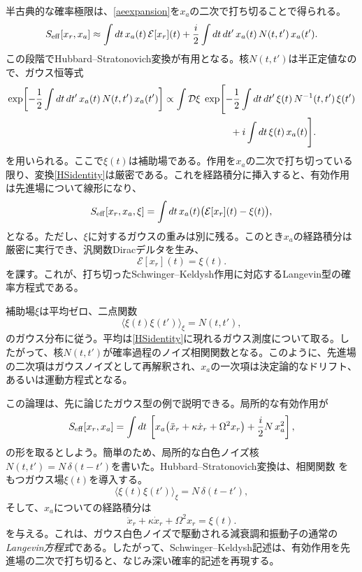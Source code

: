 \documentclass[a4paper,11pt,oneside]{article}
\theoremstyle{definition}
\numberwithin{equation}{section}
\begin{document}
半古典的な確率極限は、\eqref{aeexpansion}を\(x_a\)の二次で打ち切ることで得られる。
\begin{equation}\label{quadratictruncate}
S_{\rm eff}[x_r,x_a]
\approx
\int dt\, x_a(t)\,\mathcal E[x_r](t)
+\frac{i}{2}\int dt\,dt'\,x_a(t)\,N(t,t')\,x_a(t') .
\end{equation}
この段階でHubbard--Stratonovich変換が有用となる。核\(N(t,t')\)は半正定値なので、ガウス恒等式
\begin{align}\label{HSidentity}
\exp\!\left[
-\frac12\int dt\,dt'\,x_a(t)\,N(t,t')\,x_a(t')
\right]
&\propto
\int \mathcal D\xi\;
\exp\Biggl[
-\frac12\int dt\,dt'\,\xi(t)\,N^{-1}(t,t')\,\xi(t')
\nonumber\\
&\hspace{2.4cm}
+i\int dt\,\xi(t)\,x_a(t)
\Biggr] .
\end{align}
を用いられる。ここで\(\xi(t)\)は補助場である。作用を\(x_a\)の二次で打ち切っている限り、変換\eqref{HSidentity}は厳密である。これを経路積分に挿入すると、有効作用は先進場について線形になり、
\begin{equation}
S_{\rm eff}[x_r,x_a,\xi]
=
\int dt\,x_a(t)\bigl(\mathcal E[x_r](t)-\xi(t)\bigr) ,
\end{equation}
となる。ただし、\(\xi\)に対するガウスの重みは別に残る。このとき\(x_a\)の経路積分は厳密に実行でき、汎関数Diracデルタを生み、
\begin{equation}\label{LangevinGeneral}
\mathcal E[x_r](t)=\xi(t) .
\end{equation}
を課す。これが、打ち切ったSchwinger--Keldysh作用に対応するLangevin型の確率方程式である。



補助場\(\xi\)は平均ゼロ、二点関数
\begin{equation}
\langle \xi(t)\xi(t')\rangle_\xi = N(t,t') ,
\end{equation}
のガウス分布に従う。平均は\eqref{HSidentity}に現れるガウス測度について取る。したがって、核\(N(t,t')\)が確率過程のノイズ相関関数となる。このように、先進場の二次項はガウスノイズとして再解釈され、\(x_a\)の一次項は決定論的なドリフト、あるいは運動方程式となる。



この論理は、先に論じたガウス型の例で説明できる。局所的な有効作用が
\begin{equation}
S_{\rm eff}[x_r,x_a]
=
\int dt\,
\left[
x_a\bigl(\ddot x_r+\kappa \dot x_r+\Omega^2 x_r\bigr)
+\frac{i}{2}N\,x_a^2
\right] ,
\end{equation}
の形を取るとしよう。簡単のため、局所的な白色ノイズ核\(N(t,t')=N\,\delta(t-t')\)を書いた。Hubbard--Stratonovich変換は、相関関数
をもつガウス場\(\xi(t)\)を導入する。
\begin{equation}
\langle \xi(t)\xi(t')\rangle_\xi = N\,\delta(t-t') ,
\end{equation}
そして、\(x_a\)についての経路積分は
\begin{equation}
\ddot x_r+\kappa \dot x_r+\Omega^2 x_r=\xi(t) .
\end{equation}
を与える。これは、ガウス白色ノイズで駆動される減衰調和振動子の通常の\textit{Langevin方程式}である。したがって、Schwinger--Keldysh記述は、有効作用を先進場の二次で打ち切ると、なじみ深い確率的記述を再現する。
\end{document}
